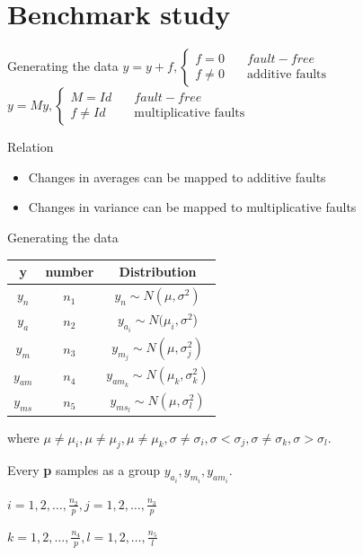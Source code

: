 \documentclass[10pt]{beamer}
\begin{document}
\section{Benchmark study}
\begin{frame}{Generating the data}
    $y = y + f, \left\{ \begin{aligned}
    f = 0      \quad &fault-free \\
    f \neq 0   \quad &\text{additive faults}
     \end{aligned} 
     \right. $
   $y = My,\left\{ \begin{aligned}
    M = Id     \quad &fault-free \\
    f \neq Id   \quad &\text{multiplicative faults}
     \end{aligned} 
     \right. $
      \begin{exampleblock}{Relation}
	\begin{itemize}
    \item Changes in averages can be mapped to additive faults
    \item Changes in variance can be mapped to multiplicative faults
    \end{itemize}
    \end{exampleblock}
\end{frame}
\begin{frame}{Generating the data}
\begin{center}
\begin{tabular}{ccc}
\hline
y& number& Distribution                                    \\
\hline
$y_n  $ &$n_1$& $y_n \sim N(\mu, \sigma^2)$                \\
$y_a  $ &$n_2$& $y_{a_i} \sim N(\mu_i,\sigma^2$)           \\
$y_m  $ &$n_3$& $y_{m_j} \sim N(\mu,\sigma_j^2)$           \\
$y_{am}$&$n_4$& $y_{am_k}\sim N(\mu_k,\sigma_k^2)$         \\
$y_{ms}$ &$n_5$& $y_{ms_l} \sim N(\mu,\sigma_l^2)$  \\
\hline
\end{tabular}
\end{center}
where $\mu \neq \mu_i,\mu \neq \mu_j,\mu \neq \mu_k,\sigma \neq \sigma_i,\sigma < \sigma_j,\sigma \neq \sigma_k,\sigma > \sigma_l$. \par Every \textbf{p} samples as a group
$y_{a_i},y_{m_i},y_{am_i}$. \par $i = 1,2,\dots,\frac{n_2}{p},j=1,2,\dots,\frac{n_3}{p}$ \par
$k = 1,2,\dots,\frac{n_4}{p},l = 1,2,\dots, \frac{n_5}{l}$
\end{frame}
\end{document}
